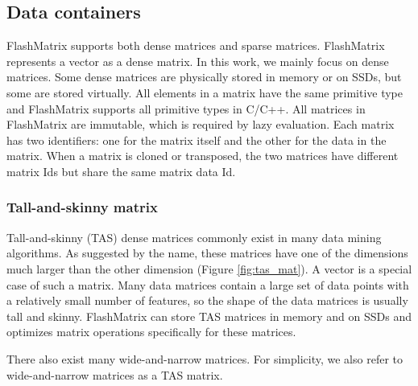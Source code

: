 \subsection{Data containers}
FlashMatrix supports both dense matrices and sparse matrices. FlashMatrix
represents a vector as a dense matrix. In this work, we mainly focus on
dense matrices. Some dense matrices are physically stored in memory or on SSDs,
but some are stored virtually. All elements in a matrix have the same primitive
type and FlashMatrix supports all primitive types in C/C++.
All matrices in FlashMatrix are immutable, which is required by lazy evaluation.
Each matrix has two identifiers: one for the matrix itself and the other for
the data in the matrix. When a matrix is cloned or transposed, the two matrices
have different matrix Ids but share the same matrix data Id.

\subsubsection{Tall-and-skinny matrix} \label{sec:tas_mat}

Tall-and-skinny (TAS) dense matrices commonly exist in many data mining
algorithms. As suggested by the name, these matrices have one of the dimensions
much larger than the other dimension (Figure \ref{fig:tas_mat}). A vector is
a special case of such a matrix. Many data matrices contain a large set of
data points with a relatively small number of features, so the shape of
the data matrices is usually tall and skinny. FlashMatrix can store TAS
matrices in memory and on SSDs and optimizes matrix operations specifically
for these matrices.

There also exist many wide-and-narrow matrices. For simplicity, we also refer
to wide-and-narrow matrices as a TAS matrix. 

